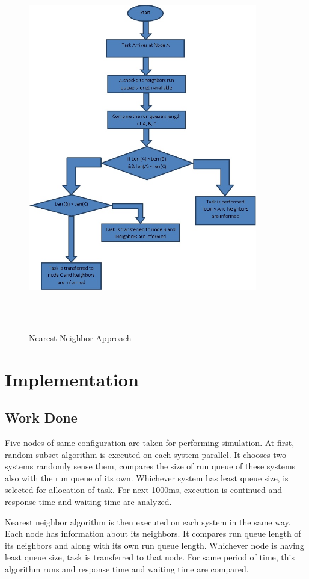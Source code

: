 \documentclass[12pt]{article}
\begin{document}
\paragraph{}
\begin{figure}[h!]
  \centering
    \includegraphics[width=10cm, height=16cm]{fig_3.jpg}
    \centering
    \caption{Nearest Neighbor Approach }
\end{figure}
\clearpage
\section{Implementation}
\subsection{Work Done}
Five nodes of same configuration are taken for performing simulation. At first, random subset algorithm is executed on each system parallel. It chooses two systems randomly sense them, compares the size of run queue of these systems also with the run queue of its own. Whichever system has least queue size, is selected for allocation of task. For next 1000ms, execution is continued and response time and waiting time are analyzed.
\\
\par Nearest neighbor algorithm is then executed on each system in the same way. Each node has information about its neighbors. It compares run queue length of its neighbors and along with its own run queue length. Whichever node is having least queue size, task is transferred to that node. For same period of time, this algorithm runs and response time and waiting time are compared.
\\
\\
\\
\\
\\
\end{document}
